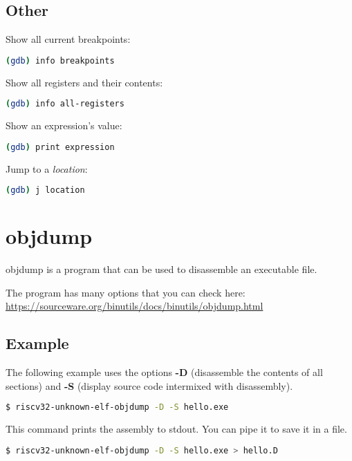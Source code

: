\documentclass{article}
\begin{document}
	\subsection{Other}
	
	Show all current breakpoints:
	\begin{lstlisting}[language=bash]
    (gdb) info breakpoints
    \end{lstlisting}
    
    Show all registers and their contents:
    \begin{lstlisting}[language=bash]
    (gdb) info all-registers
    \end{lstlisting}
    
    Show an expression's value:
    \begin{lstlisting}[language=bash]
    (gdb) print expression
    \end{lstlisting}
    
    Jump to a \textit{location}:
    \begin{lstlisting}[language=bash]
    (gdb) j location
    \end{lstlisting}
    
    \newpage
    \section{objdump}
    
    objdump is a program that can be used to disassemble an executable file.
    
    The program has many options that you can check here: \url{https://sourceware.org/binutils/docs/binutils/objdump.html}
    
    \subsection{Example}
    
    The following example uses the options \textbf{-D} (disassemble the contents of all sections) and \textbf{-S} (display source code intermixed with disassembly).
    
    \begin{lstlisting}[language=bash]
    $ riscv32-unknown-elf-objdump -D -S hello.exe
    \end{lstlisting}
    
    This command prints the assembly to stdout. You can pipe it to save it in a file.
    
    \begin{lstlisting}[language=bash]
    $ riscv32-unknown-elf-objdump -D -S hello.exe > hello.D
    \end{lstlisting}
    
	
\end{document}
